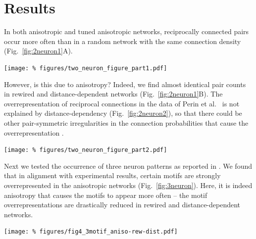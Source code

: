 
\vspace{-0.5cm}
\section*{Results}
\vspace{-0.5cm}

In both anisotropic and tuned anisotropic networks, reciprocally
connected pairs occur more often than in a random network with the
same connection density (Fig.~\ref{fig:2neuron1}A).

\begin{center}\vspace{0.01cm}
  \texttt{[image: \%
    figures/two\_neuron\_figure\_part1.pdf]}
  \label{fig:2neuron1}
\end{center}\vspace{2cm}

However, is this due to anisotropy? Indeed, we find almost identical
pair counts in rewired and distance-dependent networks
(Fig.~\ref{fig:2neuron1}B). The overrepresentation of reciprocal
connections in the data of Perin et al.~\cite{Perin2011} is not
explained by distance-dependency (Fig.~\ref{fig:2neuron2}), so that
there could be other pair-symmetric irregularities in the connection
probabilities that cause the overrepresentation \cite{Hoffmann2017}.

\begin{center}\vspace{0.01cm}
  \texttt{[image: \%
    figures/two\_neuron\_figure\_part2.pdf]}
  \label{fig:2neuron2}
\end{center}\vspace{1.6cm}

Next we tested the occurrence of three neuron patterns as reported in
\cite{Song2005}. We found that in alignment with experimental results,
certain motifs are strongly overrepresented in the anisotropic
networks (Fig.~\ref{fig:3neuron}). Here, it is indeed anisotropy that
causes the motifs to appear more often -- the motif
overrepresentations are drastically reduced in rewired and
distance-dependent
networks.  %

\begin{center}\vspace{0.01cm}
  \texttt{[image: \%
    figures/fig4\_3motif\_aniso-rew-dist.pdf]}
  \label{fig:3neuron}
\end{center}\vspace{2cm}

